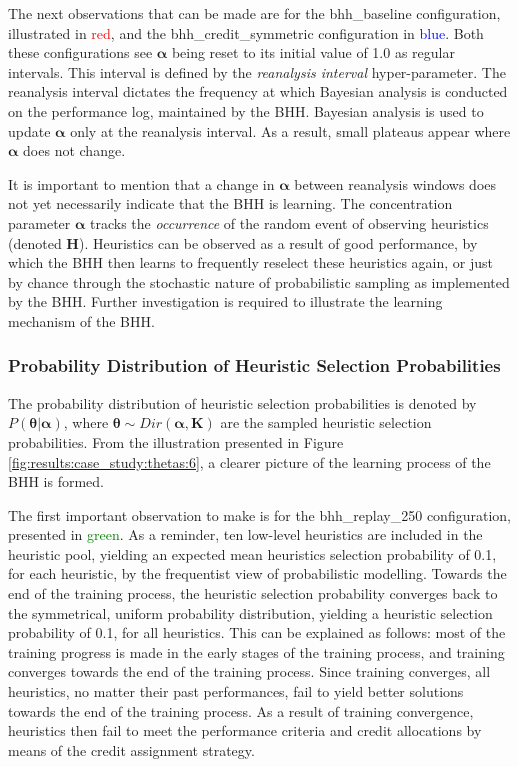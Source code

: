 The next observations that can be made are for the bhh\_baseline configuration, illustrated in \textcolor{red}{red}, and the bhh\_credit\_symmetric configuration in \textcolor{blue}{blue}. Both these configurations see $\boldsymbol{\alpha}$ being reset to its initial value of 1.0 as regular intervals. This interval is defined by the \textit{reanalysis interval} hyper-parameter. The reanalysis interval dictates the frequency at which Bayesian analysis is conducted on the performance log, maintained by the \acs{BHH}. Bayesian analysis is used to update $\boldsymbol{\alpha}$ only at the reanalysis interval. As a result, small plateaus appear where $\boldsymbol{\alpha}$ does not change.

It is important to mention that a change in $\boldsymbol{\alpha}$ between reanalysis windows does not yet necessarily indicate that the \acs{BHH} is learning. The concentration parameter $\boldsymbol{\alpha}$ tracks the \textit{occurrence} of the random event of observing heuristics (denoted $\boldsymbol{{H}}$). Heuristics can be observed as a result of good performance, by which the \acs{BHH} then learns to frequently reselect these heuristics again, or just by chance through the stochastic nature of probabilistic sampling as implemented by the \acs{BHH}. Further investigation is required to illustrate the learning mechanism of the \acs{BHH}.

\subsubsection{Probability Distribution of Heuristic Selection Probabilities}\label{sec:results:case_study:probabilities_of_probabilities}

The probability distribution of heuristic selection probabilities is denoted by $P(\boldsymbol{\theta} \vert \boldsymbol{\alpha})$, where $\boldsymbol{\theta} \sim Dir(\boldsymbol{\alpha, K})$ are the sampled heuristic selection probabilities. From the illustration presented in Figure \ref{fig:results:case_study:thetas:6}, a clearer picture of the learning process of the \acs{BHH} is formed.

The first important observation to make is for the bhh\_replay\_250 configuration, presented in \textcolor{green}{green}. As a reminder, ten low-level heuristics are included in the heuristic pool, yielding an expected mean heuristics selection probability of 0.1, for each heuristic, by the frequentist view of probabilistic modelling. Towards the end of the training process, the heuristic selection probability converges back to the symmetrical, uniform probability distribution, yielding a heuristic selection probability of 0.1, for all heuristics. This can be explained as follows: most of the training progress is made in the early stages of the training process, and training converges towards the end of the training process. Since training converges, all heuristics, no matter their past performances, fail to yield better solutions towards the end of the training process. As a result of training convergence, heuristics then fail to meet the performance criteria and credit allocations by means of the credit assignment strategy.


